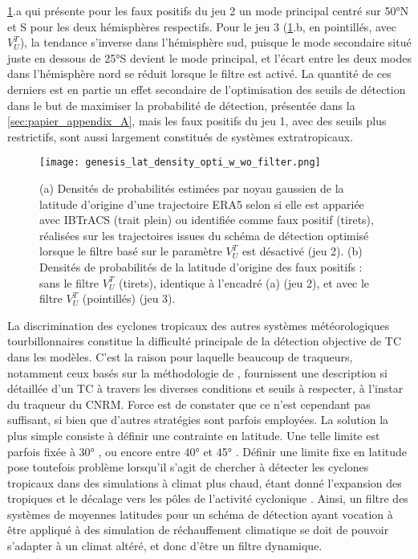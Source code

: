 \documentclass[../main.tex]{subfiles}
\begin{document}
\cref{fig:lat_density}.a qui présente pour les faux positifs du jeu 2 un mode principal centré sur \ang{50}N et S pour les deux hémisphères respectifs. Pour le
jeu 3 (\cref{fig:lat_density}.b, en pointillés, avec $V_U^T$), la tendance s'inverse dans l'hémisphère sud, puisque le mode secondaire situé juste en dessous de
\ang{25}S devient le mode principal, et l'écart entre les deux modes dans l'hémisphère nord se réduit lorsque le filtre est activé. La quantité de ces derniers
est en partie un effet secondaire de l'optimisation des seuils de détection dans le but de maximiser la probabilité de détection, présentée dans la
\cref{sec:papier_appendix_A}, mais les faux positifs du jeu 1, avec des seuils plus restrictifs, sont aussi largement constitués de systèmes extratropicaux.

\begin{figure}[tb]
    \centering
    \texttt{[image: genesis\_lat\_density\_opti\_w\_wo\_filter.png]}
    \caption{(a) Densités de probabilités estimées par noyau gaussien de la latitude d'origine d'une trajectoire ERA5 selon si elle est appariée avec IBTrACS
    (trait plein) ou identifiée comme faux positif (tirets), réalisées sur les trajectoires issues du schéma de détection optimisé lorsque le filtre basé sur
    le paramètre $V_U^T$ est désactivé (jeu 2). (b) Densités de probabilités de la latitude d'origine des faux positifs : sans le filtre $V_U^T$ (tirets),
    identique à l'encadré (a) (jeu 2), et avec le filtre $V_U^T$ (pointillés) (jeu 3).}
    \label{fig:lat_density}
\end{figure}

La discrimination des cyclones tropicaux des autres systèmes météorologiques tourbillonnaires constitue la difficulté principale de la détection objective de TC
dans les modèles. C'est la raison pour laquelle beaucoup de traqueurs, notamment ceux basés sur la méthodologie de \textcite{bengtsson_hurricanetype_1995},
fournissent une description si détaillée d'un TC à travers les diverses conditions et seuils à respecter, à l'instar du traqueur du CNRM. Force est de constater
que ce n'est cependant pas suffisant, si bien que d'autres stratégies sont parfois employées. La solution la plus simple consiste à définir une contrainte en
latitude. Une telle limite est parfois fixée à \ang{30} \parencite{bengtsson_simulation_1982,broccoli_can_1990,mcdonald_tropical_2005}, ou encore entre \ang{40}
et \ang{45} \parencite{wu_gcm_1992,tsutsui_simulated_1996,tsutsui_implications_2002,oouchi_tropical_2006,zarzycki_multidecadal_2014}. Définir une limite fixe en
latitude pose toutefois problème lorsqu'il s'agit de chercher à détecter les cyclones tropicaux dans des simulations à climat plus chaud, étant donné
l'expansion des tropiques \parencite{lucas_expanding_2014,staten_reexamining_2018} et le décalage vers les pôles de l'activité cyclonique
\parencite{kossin_poleward_2014,knutson_tropical_2020}. Ainsi, un filtre des systèmes de moyennes latitudes pour un schéma de détection ayant vocation à être
appliqué à des simulation de réchauffement climatique se doit de pouvoir s'adapter à un climat altéré, et donc d'être un filtre dynamique.
\end{document}
